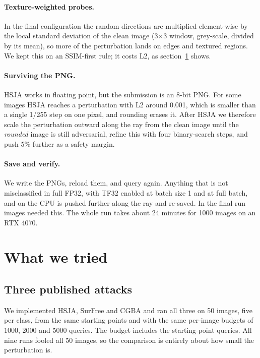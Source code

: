 \documentclass[11pt]{article}
\begin{document}
\paragraph{Texture-weighted probes.} In the final configuration the random directions are multiplied element-wise by the local standard deviation of the clean image (3$\times$3 window, grey-scale, divided by its mean), so more of the perturbation lands on edges and textured regions. We kept this on an SSIM-first rule; it costs L2, as section~\ref{sec:tried} shows.

\paragraph{Surviving the PNG.} HSJA works in floating point, but the submission is an 8-bit PNG. For some images HSJA reaches a perturbation with L2 around 0.001, which is smaller than a single 1/255 step on one pixel, and rounding erases it. After HSJA we therefore scale the perturbation outward along the ray from the clean image until the \emph{rounded} image is still adversarial, refine this with four binary-search steps, and push 5\% further as a safety margin.

\paragraph{Save and verify.} We write the PNGs, reload them, and query again. Anything that is not misclassified in full FP32, with TF32 enabled at batch size 1 and at full batch, and on the CPU is pushed further along the ray and re-saved. In the final run \nFixed{} images needed this. The whole run takes about 24 minutes for 1000 images on an RTX 4070.

\section{What we tried}
\label{sec:tried}

\subsection{Three published attacks}

We implemented HSJA, SurFree \cite{maho2021surfree} and CGBA \cite{reza2023cgba} and ran all three on 50 images, five per class, from the same starting points and with the same per-image budgets of 1000, 2000 and 5000 queries. The budget includes the starting-point queries. All nine runs fooled all 50 images, so the comparison is entirely about how small the perturbation is.
\end{document}
